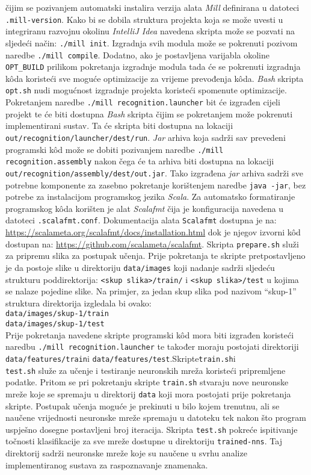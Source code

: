 čijim se pozivanjem automatski instalira verzija alata \emph{Mill} definirana u datoteci \texttt{.mill-version}. Kako bi
se dobila struktura projekta koja se može uvesti u integriranu razvojnu okolinu \emph{IntelliJ Idea} navedena skripta
može se pozvati na sljedeći način: \texttt{./mill init}. Izgradnja svih modula može se pokrenuti pozivom naredbe
\texttt{./mill compile}. Dodatno, ako je postavljena varijabla okoline \texttt{OPT\_BUILD} prilikom pokretanja izgradnje
modula tada će se pokrenuti izgradnja kôda koristeći sve moguće optimizacije za vrijeme prevođenja kôda. \emph{Bash}
skripta \texttt{opt.sh} nudi mogućnost izgradnje projekta koristeći spomenute optimizacije. Pokretanjem naredbe
\texttt{./mill recognition.launcher} bit će izgrađen cijeli projekt te će biti dostupna \emph{Bash} skripta čijim se
pokretanjem može pokrenuti implementirani sustav. Ta će skripta biti dostupna na lokaciji
\texttt{out/recognition/launcher/dest/run}. \emph{Jar} arhiva koja sadrži sav prevedeni programski kôd može se dobiti
pozivanjem naredbe \texttt{./mill recognition.assembly} nakon čega će ta arhiva biti dostupna na lokaciji
\texttt{out/recognition/assembly/dest/out.jar}. Tako izgrađena \emph{jar} arhiva sadrži sve potrebne komponente za
zasebno pokretanje korištenjem naredbe \texttt{java -jar}, bez potrebe za instalacijom programskog jezika \emph{Scala}.
Za automatsko formatiranje programskog kôda korišten je alat \emph{Scalafmt} čija je konfiguracija navedena u datoteci
\texttt{.scalafmt.conf}. Dokumentacija alata \texttt{Scalafmt} dostupna je na:
\url{https://scalameta.org/scalafmt/docs/installation.html} dok je njegov izvorni kôd dostupan na:
\url{https://github.com/scalameta/scalafmt}. Skripta \texttt{prepare.sh} služi za pripremu slika za postupak učenja.
Prije pokretanja te skripte pretpostavljeno je da postoje slike u direktoriju \texttt{data/images} koji nadanje sadrži
sljedeću strukturu poddirektorija: \texttt{<skup slika>/train/} i \texttt{<skup slika>/test} u kojima se nalaze pojedine
slike. Na primjer, za jedan skup slika pod nazivom ``skup-1'' struktura direktorija izgledala bi ovako:\\
\texttt{data/images/skup-1/train}\\
\texttt{data/images/skup-1/test}\\
Prije pokretanja navedene skripte programski kôd mora biti izgrađen koristeći naredbu
\texttt{./mill recognition.launcher} te također moraju postojati direktoriji \texttt{data/features/train}\hfill{}i
\hfill{}\texttt{data/features/test}.\hfill{}Skripte\hfill{}\texttt{train.sh}\hfill{}i\\
\texttt{test.sh} služe za učenje i testiranje neuronskih mreža koristeći pripremljene podatke. Pritom se pri pokretanju
skripte \texttt{train.sh} stvaraju nove neuronske mreže koje se spremaju u direktorij \texttt{data} koji mora postojati
prije pokretanja skripte. Postupak učenja moguće je prekinuti u bilo kojem trenutnu, ali se naučene vrijednosti
neuronske mreže spremaju u datoteku tek nakon što program uspješno dosegne postavljeni broj iteracija. Skripta
\texttt{test.sh} pokreće ispitivanje točnosti klasifikacije za sve mreže dostupne u direktoriju \texttt{trained-nns}.
Taj direktorij sadrži neuronske mreže koje su naučene u svrhu analize implementiranog sustava za raspoznavanje
znamenaka.
